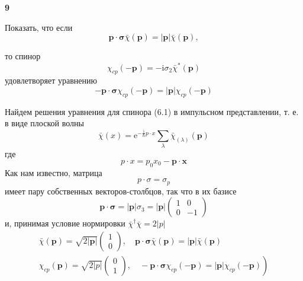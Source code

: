 \documentclass[a4paper,12pt]{article} %
\begin{document}
\begin{ttask}\textbf{9}


Показать, что если
$$
\boldsymbol{p} \cdot \boldsymbol{\sigma} \bar{\chi}(\boldsymbol{p})=|\boldsymbol{p}| \bar{\chi}(\boldsymbol{p}),
$$

то спинор
$$
\chi_{c p}(-\boldsymbol{p})=-\mathrm{i} \sigma_{2} \bar{\chi}^{*}(\boldsymbol{p})
$$
удовлетворяет уравнению
$$
-\boldsymbol{p} \cdot \boldsymbol{\sigma} \chi_{c p}(-\boldsymbol{p})=|\boldsymbol{p}| \chi_{c p}(-\boldsymbol{p})
$$



Найдем решения уравнения для спинора (6.1) в импульсном представлении, т. е. в виде плоской волны
$$
\bar{\chi}(x)=\mathrm{e}^{-\frac{\mathrm{i}}{\hbar} p \cdot x} \sum_{\lambda} \bar{\chi}_{(\lambda)}(\boldsymbol{p})
$$
где
$$
p \cdot x=p_{0} x_{0}-\boldsymbol{p} \cdot \boldsymbol{x}
$$
Как нам известно, матрица
$$
p \cdot \sigma=\sigma_{p}
$$
имеет пару собственных векторов-столбцов, так что в их базисе
$$
\boldsymbol{p} \cdot \boldsymbol{\sigma}=|\boldsymbol{p}| \sigma_{3}=|\boldsymbol{p}|\left(\begin{array}{rr}
	1 & 0 \\
	0 & -1
\end{array}\right)
$$
и, принимая условие нормировки $\bar{\chi}^{\dagger} \bar{\chi}=2|p|$
$$
\begin{array}{c}
	\bar{\chi}(\boldsymbol{p})=\sqrt{2|\boldsymbol{p}|}\left(\begin{array}{c}
		1 \\
		0
	\end{array}\right), \quad \boldsymbol{p} \cdot \boldsymbol{\sigma} \bar{\chi}(\boldsymbol{p})=|\boldsymbol{p}| \bar{\chi}(\boldsymbol{p}) \\
	\left.\chi_{c p}(\boldsymbol{p})=\sqrt{2|p|}\left(\begin{array}{c}
		0 \\
		1
	\end{array}\right), \quad-\boldsymbol{p} \cdot \boldsymbol{\sigma} \chi_{c p}(-\boldsymbol{p})=|\boldsymbol{p}| \chi_{c p}(-\boldsymbol{p})\right)
\end{array}
$$















\end{ttask}
\end{document}
